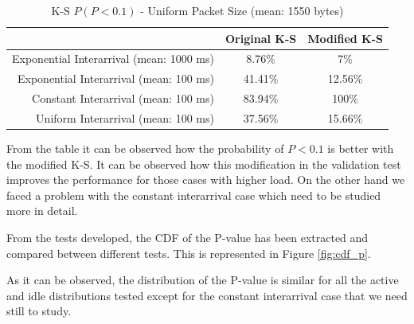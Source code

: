 \begin{table}[h!]
	\centering
	\begin{tabular}{ r | c | c }
		& Original \acs{K-S} & Modified \acs{K-S} \\ \hline
		Exponential Interarrival (mean: 1000 ms) & 8.76\% & 7\% \\ 
		Exponential Interarrival (mean: 100 ms) & 41.41\% & 12.56\% \\ 
		Constant Interarrival (mean: 100 ms) & 83.94\% & 100\% \\ 
		Uniform Interarrival (mean: 100 ms) & 37.56\% & 15.66\% \\ 
	\end{tabular}
	\caption{\acs{K-S} ${P(P<0.1)}$ - Uniform Packet Size (mean: 1550 bytes)}
	\label{table:KS}
\end{table}

From the table it can be observed how the probability of ${P<0.1}$ is better with the modified \acs{K-S}.
It can be observed how this modification in the validation test improves the performance for those cases with higher load. On the other hand we faced a problem with the constant interarrival case which need to be studied more in detail.


From the tests developed, the \acs{CDF} of the P-value has been extracted and compared between different tests. This is represented in Figure \ref{fig:cdf_p}.

As it can be observed, the distribution of the P-value is similar for all the active and idle distributions tested except for the constant interarrival case that we need still to study.


